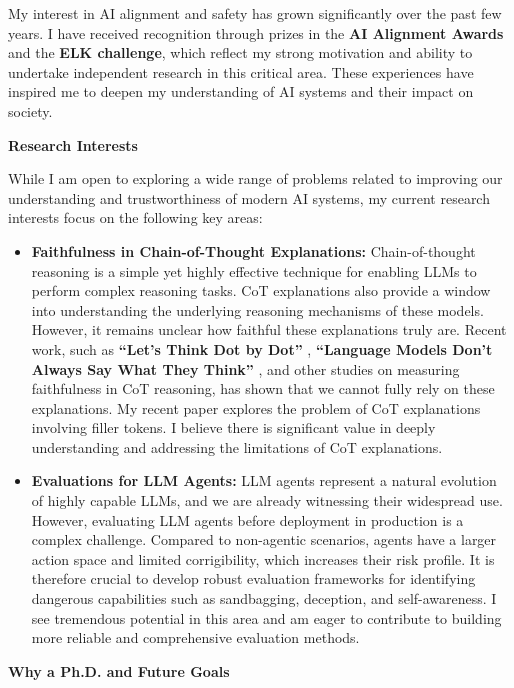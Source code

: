 \documentclass[12pt]{article}
\begin{document}
My interest in AI alignment and safety has grown significantly over the past few years. I have received recognition through prizes in the \textbf{AI Alignment Awards} \cite{alignment_awards} and the \textbf{ELK challenge}, which reflect my strong motivation and ability to undertake independent research in this critical area. These experiences have inspired me to deepen my understanding of AI systems and their impact on society.

\textbf{Research Interests}

While I am open to exploring a wide range of problems related to improving our understanding and trustworthiness of modern AI systems, my current research interests focus on the following key areas:

\begin{itemize}
    \item \textbf{Faithfulness in Chain-of-Thought Explanations:}  
    Chain-of-thought reasoning is a simple yet highly effective technique for enabling LLMs to perform complex reasoning tasks. CoT explanations also provide a window into understanding the underlying reasoning mechanisms of these models. However, it remains unclear how faithful these explanations truly are. Recent work, such as \textbf{“Let’s Think Dot by Dot”} \cite{pfau2024letsthinkdotdot}, \textbf{“Language Models Don't Always Say What They Think”} \cite{turpin2023languagemodelsdontsay}, and other studies on measuring faithfulness in CoT reasoning, has shown that we cannot fully rely on these explanations. My recent paper explores the problem of CoT explanations involving filler tokens. I believe there is significant value in deeply understanding and addressing the limitations of CoT explanations.
    \newpage
    \item \textbf{Evaluations for LLM Agents:}  
    LLM agents represent a natural evolution of highly capable LLMs, and we are already witnessing their widespread use. However, evaluating LLM agents before deployment in production is a complex challenge. Compared to non-agentic scenarios, agents have a larger action space and limited corrigibility, which increases their risk profile. It is therefore crucial to develop robust evaluation frameworks for identifying dangerous capabilities such as sandbagging, deception, and self-awareness. I see tremendous potential in this area and am eager to contribute to building more reliable and comprehensive evaluation methods.
\end{itemize}
\textbf{Why a Ph.D. and Future Goals}
\end{document}

